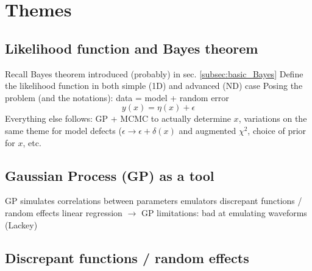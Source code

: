 \section{Themes}  \label{sec:themes}


%
%
%
\subsection{Likelihood function and Bayes theorem}  \label{subsec:L}

\bi
  \I Recall Bayes theorem introduced (probably) in sec. \ref{subsec:basic_Bayes}
  \I Define the likelihood function in both simple (1D) and advanced (ND) case
  \I Posing the problem (and the notations): data = model + random error
  $$ y(x) = \eta(x) + \epsilon  $$
  \I Everything else follows: GP + MCMC to actually determine $x$, variations on 
     the same theme for model defects ($\epsilon \rightarrow \epsilon + \delta(x)$ 
     and augmented $\chi^2$, choice of prior for $x$, etc.
\ei

\subsection{Gaussian Process (GP) as a tool}  \label{subsec:GP_tool}

\bi
  \I GP simulates correlations between parameters
  \I emulators
  \I discrepant functions / random effects 
  \I linear regression $\rightarrow$ GP
  \I limitations: bad at emulating waveforms (Lackey)
\ei

\subsection{Discrepant functions / random effects}  \label{subsec:discrepant}

